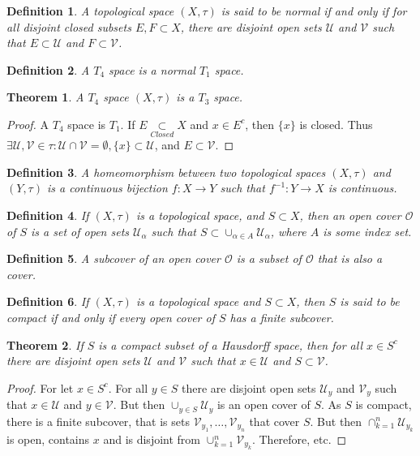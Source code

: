 \documentclass[oneside]{book}
\theoremstyle{mystyle}
\newtheorem{theorem}{Theorem}[section]
\newtheorem{definition}{Definition}[section]
\begin{document}
\begin{definition}
A topological space $(X,\tau)$ is said to be normal if and only if for all disjoint closed subsets $E,F\subset X$, there are disjoint open sets $\mathcal{U}$ and $\mathcal{V}$ such that $E\subset \mathcal{U}$ and $F\subset \mathcal{V}$.
\end{definition}

\begin{definition}
A $T_4$ space is a normal $T_1$ space.
\end{definition}

\begin{theorem}
A $T_4$ space $(X,\tau)$ is a $T_3$ space.
\end{theorem}
\begin{proof}
A $T_4$ space is $T_1$. If $E\underset{Closed}\subset X$ and $x\in E^c$, then $\{x\}$ is closed. Thus $\exists \mathcal{U},\mathcal{V}\in\tau: \mathcal{U}\cap\mathcal{V}=\emptyset, \{x\}\subset \mathcal{U}$, and $E\subset \mathcal{V}$.
\end{proof}

\begin{definition}
A homeomorphism between two topological spaces $(X,\tau)$ and $(Y,\tau)$ is a continuous bijection $f:X\rightarrow Y$ such that $f^{-1}:Y\rightarrow X$ is continuous.
\end{definition}

\begin{definition}
If $(X,\tau)$ is a topological space, and $S\subset X$, then an open cover $\mathcal{O}$ of $S$ is a set of open sets $\mathcal{U}_{\alpha}$ such that $S\subset \cup_{\alpha\in A} \mathcal{U}_{\alpha}$, where $A$ is some index set.
\end{definition}

\begin{definition}
A subcover of an open cover $\mathcal{O}$ is a subset of $\mathcal{O}$ that is also a cover.
\end{definition}

\begin{definition}
If $(X,\tau)$ is a topological space and $S\subset X$, then $S$ is said to be compact if and only if every open cover of $S$ has a finite subcover.
\end{definition}

\begin{theorem}
If $S$ is a compact subset of a Hausdorff space, then for all $x\in S^c$ there are disjoint open sets $\mathcal{U}$ and $\mathcal{V}$ such that $x\in \mathcal{U}$ and $S\subset \mathcal{V}$.
\end{theorem}
\begin{proof}
For let $x\in S^c$. For all $y\in S$ there are disjoint open sets $\mathcal{U}_y$ and $\mathcal{V}_y$ such that $x\in \mathcal{U}$ and $y\in \mathcal{V}$. But then $\cup_{y\in S} \mathcal{U}_y$ is an open cover of $S$. As $S$ is compact, there is a finite subcover, that is sets $\mathcal{V}_{y_1},\hdots, \mathcal{V}_{y_n}$ that cover $S$. But then $\cap_{k=1}^{n} \mathcal{U}_{y_k}$ is open, contains $x$ and is disjoint from $\cup_{k=1}^{n} \mathcal{V}_{y_k}$. Therefore, etc.
\end{proof}
\end{document}
